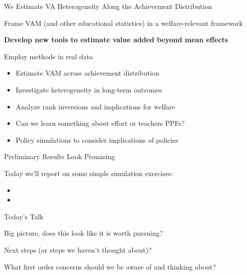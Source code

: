 \documentclass[t,aspectratio=169,11pt]{beamer}
\newenvironment{wideitemize}{\itemize\addtolength{\itemsep}{14pt}}{\enditemize}
\newenvironment{wideenumerate}{\enumerate\addtolength{\itemsep}{14pt}}{\endenumerate}
\begin{document}
\begin{frame}{We Estimate VA Heterogeneity Along the Achievement Distribution}


\begin{wideenumerate}
     \item Frame VAM (and other educational statistics) in a welfare-relevant framework

    \item \textbf<2>{Develop new tools to estimate value added beyond mean effects}
    \item Employ methods in real data
    \begin{itemize}
        \item Estimate VAM across achievement distribution
        \item Investigate heterogeneity in long-term outcomes 
        \item Analyze rank inversions and implications for welfare
        \item Can we learn something about effort or teachers PPFs?
        \item Policy simulations to consider implications of policies
    \end{itemize}  

\end{wideenumerate}
\end{frame}

\begin{frame}{Preliminary Results Look Promising}


\begin{wideitemize}
\item Today we'll report on some simple simulation exercises:
\begin{itemize}
    \item<2-> 
    \item<3-> 
\end{itemize}
\item<4-> 
\end{wideitemize}
\end{frame}

\begin{frame}[c]{Today's Talk}

\begin{wideenumerate}
    \item Big picture, does this look like it is worth pursuing?
    \item Next steps (or steps we haven't thought about)?
    \item What first order concerns should we be aware of and thinking about?

\end{wideenumerate}
\end{frame}
\end{document}
